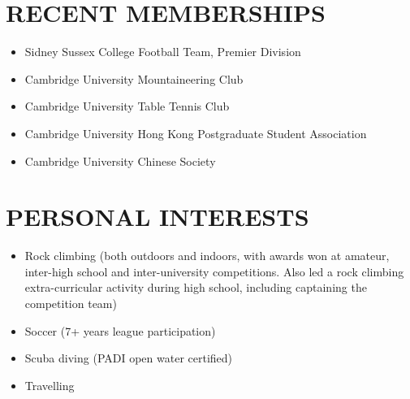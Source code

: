 \documentclass[a4paper,10pt]{extarticle}
\begin{document}




\section*{RECENT MEMBERSHIPS}
\begin{itemize}
    \item Sidney Sussex College Football Team, Premier Division

    \item Cambridge University Mountaineering Club

    \item Cambridge University Table Tennis Club

    \item Cambridge University Hong Kong Postgraduate Student Association

    \item Cambridge University Chinese Society
\end{itemize}

\section*{PERSONAL INTERESTS}
\begin{itemize}
    \item Rock climbing (both outdoors and indoors, with awards won at amateur, inter-high school and inter-university competitions. Also led a rock climbing extra-curricular activity during high school, including captaining the competition team)

    \item Soccer (7+ years league participation)

    \item Scuba diving (PADI open water certified)

    \item Travelling
\end{itemize}







\end{document}
